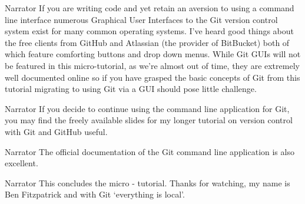\documentclass{screenplay} %
\begin{document}
\begin{dialogue}{Narrator}
If you are writing code and yet retain an aversion to using a command line interface numerous Graphical User Interfaces to the Git version control system exist for many common operating systems.
\newline
\newline
I've heard good things about the free clients from GitHub and Atlassian (the provider of BitBucket) both of which feature comforting buttons and drop down menus.
While Git GUIs will not be featured in this micro-tutorial, as we're almost out of time, they are extremely well documented online so if you have grasped the basic concepts of Git from this tutorial migrating to using Git via a GUI should pose little challenge.
\end{dialogue}

\begin{dialogue}{Narrator} 
If you decide to continue using the command line application for Git, you may find the freely available slides for my longer tutorial on version control with Git and GitHub useful.
\end{dialogue}

\begin{dialogue}{Narrator} 
The official documentation of the Git command line application is also excellent.
\end{dialogue}

\begin{dialogue}{Narrator}
This concludes the micro - tutorial.
Thanks for watching, my name is Ben Fitzpatrick and with Git `everything is local'.
\end{dialogue}

\fadeout
\theend
\end{document}
